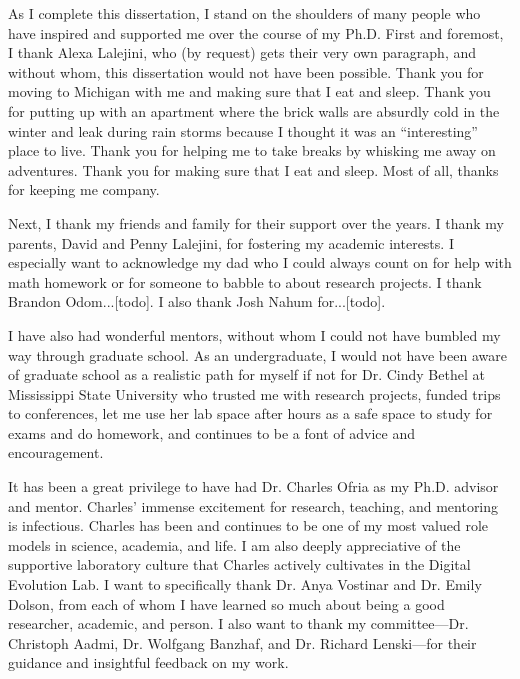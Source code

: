 
As I complete this dissertation, I stand on the shoulders of many people who have inspired and supported me over the course of my Ph.D.
First and foremost, I thank Alexa Lalejini, who (by request) gets their very own paragraph, and without whom, this dissertation would not have been possible. 
Thank you for moving to Michigan with me and making sure that I eat and sleep. 
Thank you for putting up with an apartment where the brick walls are absurdly cold in the winter and leak during rain storms because I thought it was an ``interesting'' place to live.
Thank you for helping me to take breaks by whisking me away on adventures. %
Thank you for making sure that I eat and sleep.
Most of all, thanks for keeping me company. 

Next, I thank my friends and family for their support over the years. 
I thank my parents, David and Penny Lalejini, for fostering my academic interests. %
I especially want to acknowledge my dad who I could always count on for help with math homework or for someone to babble to about research projects.
I thank Brandon Odom...[todo].
I also thank Josh Nahum for...[todo].

I have also had wonderful mentors, without whom I could not have bumbled my way through graduate school. %
As an undergraduate, I would not have been aware of graduate school as a realistic path for myself if not for Dr. Cindy Bethel at Mississippi State University who trusted me with research projects, funded trips to conferences, let me use her lab space after hours as a safe space to study for exams and do homework, and continues to be a font of advice and encouragement.

It has been a great privilege to have had Dr. Charles Ofria as my Ph.D. advisor and mentor.
Charles' immense excitement for research, teaching, and mentoring is infectious. 
Charles has been and continues to be one of my most valued role models in science, academia, and life.
I am also deeply appreciative of the supportive laboratory culture that Charles actively cultivates in the Digital Evolution Lab.
I want to specifically thank Dr. Anya Vostinar and Dr. Emily Dolson,
from each of whom I have learned so much about being a good researcher, academic, and person.
I also want to thank my committee---Dr. Christoph Aadmi, Dr. Wolfgang Banzhaf, and Dr. Richard Lenski---for their guidance and insightful feedback on my work. 

